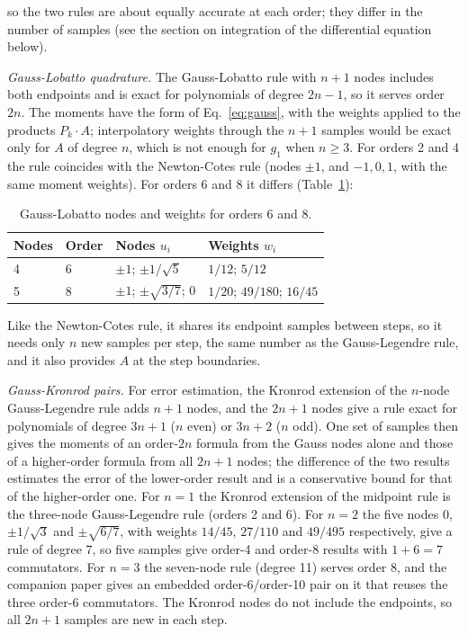 \documentclass[12pt]{article}
\begin{document}
\noindent so the two rules are about equally accurate at each order; they differ in the number of samples (see the section on integration of the differential equation below).

\emph{Gauss-Lobatto quadrature.} The Gauss-Lobatto rule with $n+1$ nodes includes both endpoints and is exact for polynomials of degree $2n-1$, so it serves order $2n$. The moments have the form of Eq.~\ref{eq:gauss}, with the weights applied to the products $P_k\cdot A$; interpolatory weights through the $n+1$ samples would be exact only for $A$ of degree $n$, which is not enough for $g_1$ when $n\ge3$. For orders 2 and 4 the rule coincides with the Newton-Cotes rule (nodes $\pm1$, and $-1,0,1$, with the same moment weights). For orders 6 and 8 it differs (Table~\ref{tab:lobatto}):

\begin{table}[H]
\centering\small
\caption{Gauss-Lobatto nodes and weights for orders 6 and 8.}\label{tab:lobatto}
\begin{tabular}{llll}
\hline
Nodes & Order & Nodes $u_i$ & Weights $w_i$ \\ \hline
4 & 6 & $\pm1$; $\pm1/\sqrt{5}$ & $1/12$; $5/12$ \\
5 & 8 & $\pm1$; $\pm\sqrt{3/7}$; $0$ & $1/20$; $49/180$; $16/45$ \\ \hline
\end{tabular}
\end{table}

\noindent Like the Newton-Cotes rule, it shares its endpoint samples between steps, so it needs only $n$ new samples per step, the same number as the Gauss-Legendre rule, and it also provides $A$ at the step boundaries.

\emph{Gauss-Kronrod pairs.} For error estimation, the Kronrod extension \cite{kronrod} of the $n$-node Gauss-Legendre rule adds $n+1$ nodes, and the $2n+1$ nodes give a rule exact for polynomials of degree $3n+1$ ($n$ even) or $3n+2$ ($n$ odd). One set of samples then gives the moments of an order-$2n$ formula from the Gauss nodes alone and those of a higher-order formula from all $2n+1$ nodes; the difference of the two results estimates the error of the lower-order result and is a conservative bound for that of the higher-order one. For $n=1$ the Kronrod extension of the midpoint rule is the three-node Gauss-Legendre rule (orders 2 and 6). For $n=2$ the five nodes $0$, $\pm1/\sqrt{3}$ and $\pm\sqrt{6/7}$, with weights $14/45$, $27/110$ and $49/495$ respectively, give a rule of degree 7, so five samples give order-4 and order-8 results with $1+6=7$ commutators. For $n=3$ the seven-node rule (degree 11) serves order 8, and the companion paper \cite{j10} gives an embedded order-6/order-10 pair on it that reuses the three order-6 commutators. The Kronrod nodes do not include the endpoints, so all $2n+1$ samples are new in each step.
\end{document}
